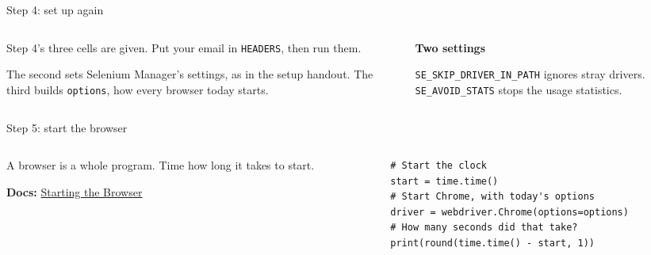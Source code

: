 \documentclass[9pt,aspectratio=169]{beamer}
\begin{document}
\begin{frame}{Step 4: set up again}
    \begin{columns}[T]
        \begin{column}{0.6\textwidth}
            Step 4's three cells are given. Put your email in \texttt{HEADERS}, then run them.

            \medskip
            The second sets Selenium Manager's settings, as in the setup handout. The third builds \texttt{options}, how every browser today starts.
        \end{column}
        \begin{column}{0.35\textwidth}
            \textbf{Two settings}\\[2pt]
            {\footnotesize \texttt{SE\_SKIP\_DRIVER\_IN\_PATH} ignores stray drivers. \texttt{SE\_AVOID\_STATS} stops the usage statistics.\par}
        \end{column}
    \end{columns}
\end{frame}

\begin{frame}[fragile]{Step 5: start the browser}
    \begin{columns}[T]
        \begin{column}{0.37\textwidth}
            A browser is a whole program. Time how long it takes to start.

            \medskip
            {\scriptsize\textbf{Docs:} \href{https://cuinfoscience.github.io/Web-Data-Science-Book/ch-08-dynamic-pages.html\#starting-the-browser}{Starting the Browser}\par}
        \end{column}
        \begin{column}{0.6\textwidth}
\begin{lstlisting}[style=lab]
# Start the clock
start = time.time()
# Start Chrome, with today's options
driver = webdriver.Chrome(options=options)
# How many seconds did that take?
print(round(time.time() - start, 1))
\end{lstlisting}
        \end{column}
    \end{columns}
\end{frame}
\end{document}

